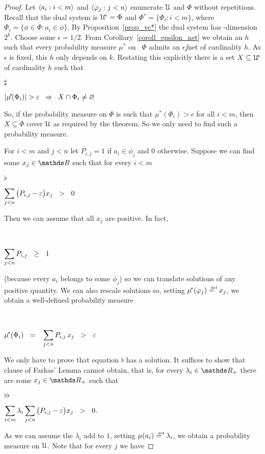 \documentclass[combinatorics.tex]{subfiles}
\begin{document}
\begin{proof}
Let $\langle a_i:i<m\rangle$ and $\langle\varphi_j:j<n\rangle$ enumerate $\EuScript U$ and $\Phi$ without repetitions.
Recall that the dual system is $\EuScript U\!^*=\Phi$ and $\Phi\!^{*}\!=\big\{\Phi_i: i<m\big\}$, where $\Phi_i=\big\{\phi\in\Phi: a_i\in\phi\big\}$.
By Proposition~\ref{prop_vc*} the dual system has \vc-dimension $2^k$.
Choose some $\epsilon=1/2$.
From Corollary~\ref{coroll_epsilon_net} we obtain an $h$ such that every probability measure $\mu\!^*$ on \ $\Phi$ admits an $\epsilon\jj$net of cardinality $h$.
As $\epsilon$ is fixed, this $h$ only depends on $k$.
Restating this explicitly there is a set $X\subseteq\EuScript U\!^*$ of cardinality $h$ such that

\parbox{10ex}{$\sharp$}
$\displaystyle\left|\mu\!^*\!(\Phi_i)\right|>\epsilon\medrel{\IMP}X\cap\Phi_i\neq\0$

So, if the probability measure on $\Phi$ is such that $\mu\!^*\!(\Phi_i)>\epsilon$ for all $i<m$, then $X\subseteq\Phi$ cover $\EuScript U$ as required by the theorem.
So we only need to find such a probability measure.

For $i<m$ and $j<n$ let $P_{i,j}=1$ if $a_i\in\phi_j$ and $0$ otherwise.
Suppose we can find some $x_j\in\RR$ such that for every $i<m$

\parbox{10ex}{$\flat$}
$\displaystyle\sum_{j<n}\big(P_{i,j}-\epsilon\big)x_j\medrel{>}0$

Then we can assume that all $x_j$ are positive.
In fact,

\parbox{10ex}{~}
$\displaystyle\sum_{j<n}P_{i,j}\medrel{\ge}1$

(because every $a_i$ belongs to some $\phi_j$) so we can translate solutions of any positive quantity.
We can also rescale solutions so, setting $\mu\!^*(\phi_j)\deq x_j$, we obtain a well-defined probability measure

\parbox{10ex}{~}
$\displaystyle\mu\!^*(\Phi_i)\medrel{=}\sum_{j<n}P_{i,j}\,x_j\medrel{>}\epsilon$

We only have to prove that equation $\flat$ has a solution.
It suffices to show that clause  of Farkas' Lemma cannot obtain, that is, for every $\lambda_i\in\RR_+$ there are some $x_j\in\RR_+$ such that

\parbox{10ex}{$\flat\flat$}
$\displaystyle\sum_{i<m}\lambda_i\sum_{j<n}\big(P_{i,j}-\epsilon\big)x_j\medrel{>}0$.

As we can assume the $\lambda_i$ add to $1$, setting $\mu(a_i)\deq\lambda_i$, we obtain a probability measure on $\EuScript U$.
Note that for every $j$ we have


\end{proof}
\end{document}
